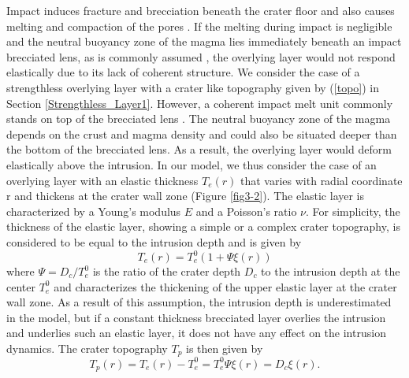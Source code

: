 \begin{article}
        Impact  induces fracture  and brecciation  beneath the  crater
        floor  \citep{Wilhelms1987a,Melosh1989,Jolliff2000}  and  also
        causes    melting     and    compaction    of     the    pores
        \citep{Melosh1989,Schultz1976}. If  the melting  during impact
        is negligible and the neutral  buoyancy zone of the magma lies
        immediately beneath an impact  brecciated lens, as is commonly
        assumed    \citep{Schultz1976,Wichman1996,Jozwiak2012},    the
        overlying layer would not respond  elastically due to its lack
        of coherent structure. We consider  the case of a strengthless
        overlying  layer  with  a  crater  like  topography  given  by
        (\ref{topo}) in Section  \ref{Strengthless_Layer1}. However, a
        coherent  impact  melt unit  commonly  stands  on top  of  the
        brecciated  lens  \citep{Melosh1989,Schultz1976}. The  neutral
        buoyancy  zone of  the magma  depends on  the crust  and magma
        density and could  also be situated deeper than  the bottom of
        the brecciated  lens. As a  result, the overlying  layer would
        deform elastically above the intrusion.  In our model, we thus
        consider  the  case of  an  overlying  layer with  an  elastic
        thickness $T_e(r)$  that varies  with radial coordinate  r and
        thickens at  the crater  wall zone (Figure  \ref{fig3-2}). The
        elastic layer is characterized by  a Young's modulus $E$ and a
        Poisson's ratio  $\nu$. For  simplicity, the thickness  of the
        elastic  layer,   showing  a   simple  or  a   complex  crater
        topography, is considered  to be equal to  the intrusion depth
        and is given by
	 	 \begin{equation}
                   T_e(r)=T_{e}^0(1+\Psi \xi(r))
                   \label{3-2}
                 \end{equation}	
                 where $\Psi=D_{c}/T_{e}^0$ is the ratio of the crater
                 depth $D_{c}$  to the  intrusion depth at  the center
                 $T_{e}^0$  and characterizes  the  thickening of  the
                 upper elastic  layer at the  crater wall zone.   As a
                 result  of this  assumption, the  intrusion depth  is
                 underestimated  in  the  model,  but  if  a  constant
                 thickness brecciated layer overlies the intrusion and
                 underlies such an elastic layer, it does not have any
                 effect  on   the  intrusion  dynamics.    The  crater
                 topography $T_p$ is then given by
		  \begin{equation}
                    T_p(r)=T_e(r)-T_e^0=T_e^0\Psi\xi(r)=D_c\xi(r).
                    \label{topo1}
		  \end{equation}
	 

\end{article}
